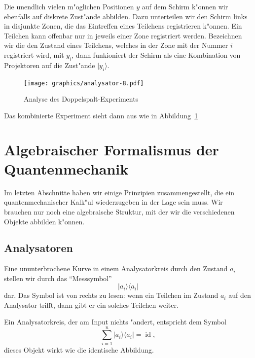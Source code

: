 Die unendlich vielen m"oglichen Positionen $y$ auf dem Schirm
k"onnen wir ebenfalls auf diskrete Zust"ande abbilden.
Dazu unterteilen wir den Schirm links in
disjunkte Zonen, die das Eintreffen eines Teilchens registrieren k"onnen.
Ein Teilchen kann offenbar nur in jeweils einer Zone registriert werden.
Bezeichnen wir die den Zustand eines Teilchens, welches in der Zone mit
der Nummer $i$ registriert wird, mit $y_i$, dann funkioniert der Schirm als
eine Kombination von Projektoren auf die Zust"ande $|y_i\rangle$.
\begin{figure}
\centering
\texttt{[image: graphics/analysator-8.pdf]}
\caption{Analyse des Doppelspalt-Experiments
\label{skript:doppelspalt-analyse}}
\end{figure}
Das kombinierte Experiment sieht dann aus wie in
Abbildung~\ref{skript:doppelspalt-analyse}

\section{Algebraischer Formalismus der Quantenmechanik}
Im letzten Abschnitte haben wir einige Prinzipien zusammengestellt,
die ein quantenmechanischer Kalk"ul wiederzugeben in der Lage sein muss.
Wir brauchen nur noch eine algebraische Struktur, mit der wir die 
verschiedenen Objekte abbilden k"onnen.

\subsection{Analysatoren}
Eine ununterbrochene Kurve in einem Analysatorkreis durch den Zustand
$a_i$ stellen wir durch das ``Messsymbol'' 
\[
|a_i\rangle\langle a_i|
\]
dar. Das Symbol ist von rechts zu lesen: wenn ein Teilchen
im Zustand $a_i$ auf den Analysator trifft, dann gibt er ein solches
Teilchen weiter.

Ein Analysatorkreis, der am Input nichts "andert, entspricht dem Symbol
\[
\sum_{i=1}^n |a_i\rangle \langle a_i|=\operatorname{id},
\]
dieses Objekt wirkt wie die identische Abbildung.

